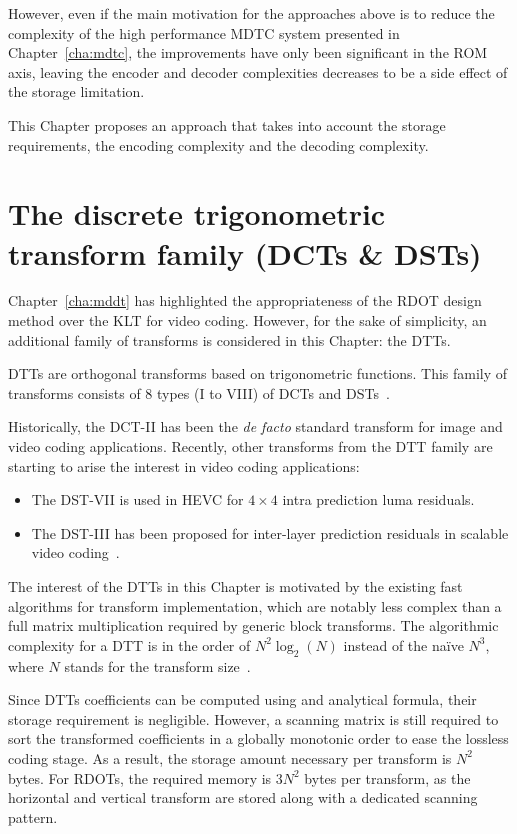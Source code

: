 \documentclass[11pt,a4paper,openright,twoside]{book}
\numberwithin{equation}{section} %
\numberwithin{figure}{section} %
\numberwithin{table}{section} %
\begin{document}
However, even if the main motivation for the approaches above is to reduce
the complexity of the high performance \ac{MDTC} system presented in
Chapter~\ref{cha:mdtc}, the improvements have only been significant in the
\acs{ROM} axis, leaving the encoder and decoder complexities decreases to be a
side effect of the storage limitation.

This Chapter proposes an approach that takes into account the storage
requirements, the encoding complexity and the decoding complexity.

\section{The discrete trigonometric transform family (\acsp{DCT} \& \acsp{DST})}
\label{sec:the_dtt_family}

Chapter~\ref{cha:mddt} has highlighted the appropriateness of the \ac{RDOT}
design method over the \ac{KLT} for video coding.
However, for the sake of simplicity, an additional family of transforms is
considered in this Chapter: the \acfp{DTT}.

\acsp{DTT} are orthogonal transforms based on trigonometric functions.
This family of transforms consists of 8 types (I to VIII) of \acfp{DCT} and
\acfp{DST}~\cite{rao-01-transform-data-compression-book,
puschel-08-algorithms-dct-dst}.

Historically, the \ac{DCT}-II has been the \emph{de facto} standard transform
for image and video coding applications.
Recently, other transforms from the \ac{DTT} family are starting to arise the
interest in video coding applications:
\begin{itemize}
	\item The \ac{DST}-VII is used in \ac{HEVC} for $4\times4$ intra
		prediction luma residuals.
	\item The \ac{DST}-III has been proposed for inter-layer prediction
		residuals in scalable video
		coding~\cite{guo-14-transform-inter-layer-scalable}.
\end{itemize}

The interest of the \acp{DTT} in this Chapter is motivated by the existing
fast algorithms for transform implementation, which are notably less complex
than a full matrix multiplication required by generic block transforms.
The algorithmic complexity for a \ac{DTT} is in the order of $N^2\log_2(N)$
instead of the naïve $N^3$, where $N$ stands for the transform
size~\cite{puschel-08-algorithms-dct-dst}.

Since \acp{DTT} coefficients can be computed using and analytical formula,
their storage requirement is negligible.
However, a scanning matrix is still required to sort the transformed
coefficients in a globally monotonic order to ease the lossless coding stage.
As a result, the storage amount necessary per transform is $N^2$ bytes.
For \acp{RDOT}, the required memory is $3N^2$ bytes per transform, as the
horizontal and vertical transform are stored along with a dedicated scanning
pattern.
\end{document}
